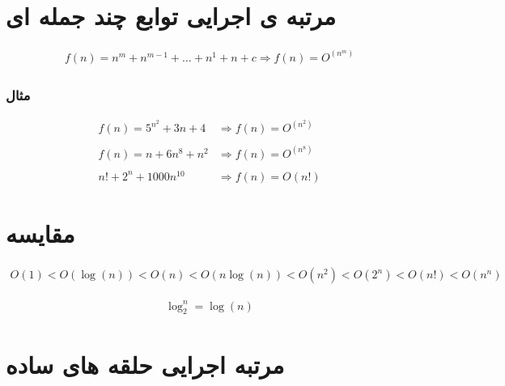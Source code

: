 \documentclass[12pt]{book}
\begin{document}
\section{مرتبه ی اجرایی توابع چند جمله ای}


\begin{tcolorbox}
\Large
\begin{align*}
f(n) = n^{m} + n^{m-1} + \dots + n^{1} + n + c \Rightarrow f(n) = O^{(n^{m})}
\end{align*}
\end{tcolorbox}


\subsubsection{مثال}


\begin{align*}
f(n) = 5^{n^{2}} + 3n + 4 &\Rightarrow f(n) = O^{(n^{2})}
\\ \\
f(n) = n + 6n^{8} + n^{2} &\Rightarrow f(n) = O^{(n^{8})}
\\ \\
n! + 2^{n} + 1000n^{10} &\Rightarrow f(n) = O(n!)
\end{align*}


\newpage


\section{مقایسه}


\begin{align*}
 O(1) <  O(\log{(n)}) <  O(n) <  O(n\log{(n)}) <  O(n^{2}) <  O(2^{n}) <  O(n!) <  O(n^{n})
\end{align*}




\begin{tcolorbox}
\Large
\begin{align*}
\log^{n}_{2} = \log{(n)}
\end{align*}
\end{tcolorbox}




\section{مرتبه اجرایی حلقه های ساده}
\end{document}
